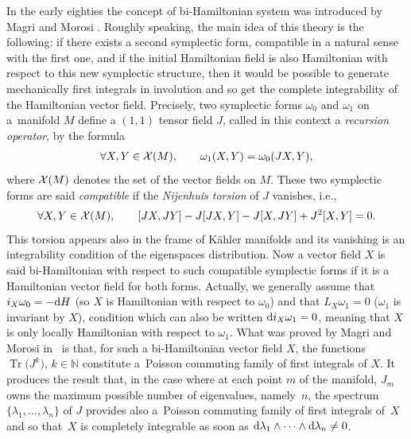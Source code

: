 \documentclass[10pt,a4paper]{amsart}
\numberwithin{equation}{section}
\begin{document}
In the early eighties the concept of bi-Hamiltonian system was introduced by Magri and Morosi \cite{MaMo}. Roughly speaking, the main idea of this theory is the following: if there exists a second symplectic form, compatible in a natural sense with the first one, and if the initial Hamiltonian field is also Hamiltonian with respect to this new symplectic structure, then it would be possible to generate mechanically first integrals in involution and so get the complete integrability of the Hamiltonian vector field. Precisely, two symplectic forms $\omega_0$ and $\omega_1$ on a~manifold $M$ define a $(1,1)$ tensor field $J$, called in this context a {\it recursion operator}, by the formula
\begin{gather*}
\forall X,Y\in{\cal X}(M),\qquad \omega_1(X,Y)=\omega_0(JX,Y),
\end{gather*}
where ${\cal X}(M)$ denotes the set of the vector fields on $M$.
These two symplectic forms are said {\it compatible} if the {\it Nijenhuis torsion} of $J$ \cite{Nij} vanishes, i.e.,
\begin{gather*}
\forall X,Y\in{\cal X}(M),\qquad [JX,JY]-J[JX,Y]-J[X,JY]+J^2[X,Y]=0.
\end{gather*}
This torsion appears also in the frame of K\"ahler manifolds and its vanishing is an integrability condition of the eigenspaces distribution.
Now a vector field $X$ is said bi-Hamiltonian with respect to such compatible symplectic forms if it is a Hamiltonian vector field for both forms. Actually, we generally assume that $i_X\omega_0=-{\rm d}H$ (so $X$ is Hamiltonian with respect to $\omega_0$) and that $L_X\omega_1=0$ ($\omega_1$ is invariant by $X$), condition which can also be written ${\rm d}i_X\omega_1=0$, meaning that $X$ is only locally Hamiltonian with respect to $\omega_1$.
What was proved by Magri and Morosi in~\cite{MaMo} is that, for such a bi-Hamiltonian vector field $X$, the functions $\operatorname{Tr}\big(J^k\big)$, $k\in\mathbb{N}$ constitute a~Poisson commuting family of first integrals of $X$. It produces the result that, in the case where at each point $m$ of the manifold, $J_m$ owns the maximum possible number of eigenvalues, namely~$n$, the spectrum $\{\lambda_1,\dots,\lambda_n\}$ of $J$ provides also a~Poisson commuting family of first integrals of~$X$ and so that~$X$ is completely integrable as soon as ${\rm d}\lambda_1\wedge\cdots\wedge {\rm d}\lambda_n\not=0$.
\end{document}

